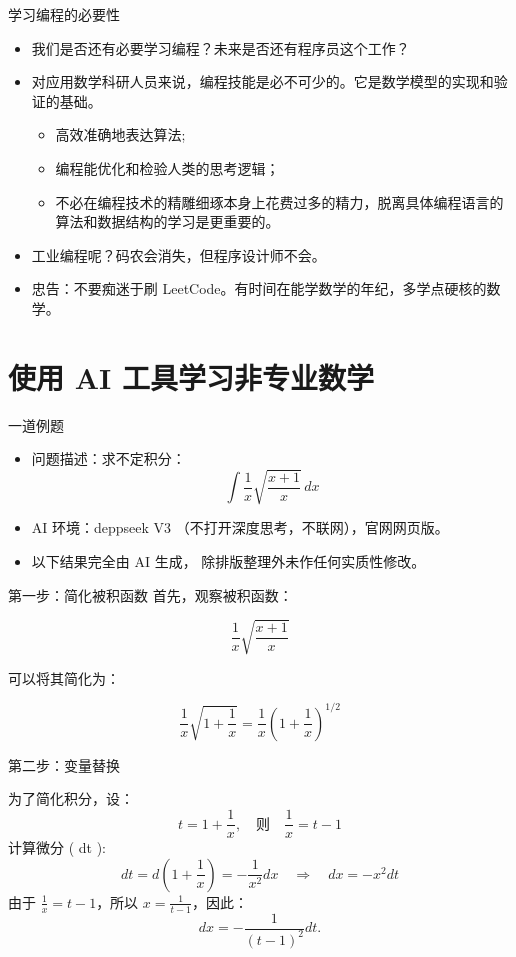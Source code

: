 \documentclass{beamer}
\begin{document}
\begin{frame}{学习编程的必要性}
  \begin{itemize}
  \item<1-> 我们是否还有必要学习编程？未来是否还有程序员这个工作？
  \item<2-> 对应用数学科研人员来说，编程技能是必不可少的。它是数学模型的实现和验证的基础。
  \begin{itemize}
    \item 高效准确地表达算法;
    \item 编程能优化和检验人类的思考逻辑；
    \item 不必在编程技术的精雕细琢本身上花费过多的精力，脱离具体编程语言的算法和数据结构的学习是更重要的。
  \end{itemize}
  \item<3-> 工业编程呢？码农会消失，但程序设计师不会。
  \item<4-> {\color{red}忠告：不要痴迷于刷 LeetCode。有时间在能学数学的年纪，多学点硬核的数学。}
  \end{itemize}
\end{frame}

\section{使用 AI 工具学习非专业数学}

\begin{frame}{一道例题}
  \begin{itemize}
  \item<1-> 问题描述：求不定积分：
  $$
    \int \frac{1}{x} \sqrt{\frac{x + 1}{x}} \, dx
  $$
  \item<2-> AI 环境：deppseek V3 （不打开深度思考，不联网），官网网页版。
  \item<3-> 以下结果完全由 AI 生成，
  除排版整理外未作任何实质性修改。 
  \end{itemize}
\end{frame}

\begin{frame}{第一步：简化被积函数}
首先，观察被积函数：

$$
\frac{1}{x} \sqrt{\frac{x + 1}{x}}
$$

可以将其简化为：

$$
\frac{1}{x} \sqrt{1 + \frac{1}{x}} = \frac{1}{x} \left(1 + \frac{1}{x}\right)^{1/2}
$$
\end{frame}

\begin{frame}{第二步：变量替换}

为了简化积分，设：
$$
t = 1 + \frac{1}{x}, \quad \text{则} \quad \frac{1}{x} = t - 1
$$
计算微分 ( dt ):
$$
dt = d\left(1 + \frac{1}{x}\right) = -\frac{1}{x^2} dx \quad \Rightarrow \quad dx = -x^2 dt
$$
由于 $\frac{1}{x} = t - 1$，所以 $x = \frac{1}{t - 1}$，因此：
$$
dx = -\frac{1}{(t - 1)^2} dt.
$$
\end{frame}
\end{document}
